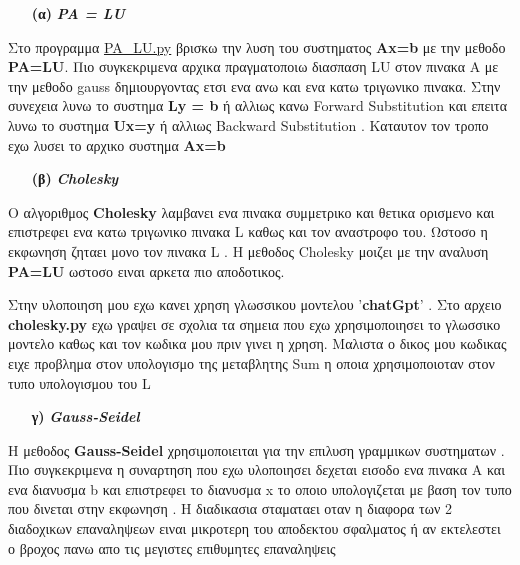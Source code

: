\documentclass[a4paper,11pt]{article}
\begin{document}
	\begin{enumerate}
		\item[\textbf{(α)}] \emph {\textbf{PA = LU}}
	\end{enumerate}
	\begin{center}
		Στο προγραμμα \underline{PA\_LU.py} βρισκω την λυση του συστηματος \textbf{Ax=b} με την μεθοδο \textbf{PA=LU}. Πιο συγκεκριμενα αρχικα πραγματοποιω διασπαση LU στον πινακα Α με την μεθοδο gauss δημιουργοντας ετσι ενα ανω και ενα κατω τριγωνικο πινακα. Στην συνεχεια λυνω το συστημα \textbf{Ly = b} ή αλλιως κανω Forward Substitution και επειτα λυνω το συστημα \textbf{Ux=y} ή αλλιως Backward Substitution . Καταυτον τον τροπο εχω λυσει το αρχικο συστημα \textbf{Ax=b}
	\end{center}
	\begin{enumerate}
		\item[\textbf{(β)}] \emph {\textbf{Cholesky}}
	\end{enumerate}
	\begin{center}
		Ο αλγοριθμος \textbf{Cholesky} λαμβανει ενα πινακα συμμετρικο και θετικα ορισμενο και επιστρεφει ενα κατω τριγωνικο πινακα L καθως και τον αναστροφο του. Ωστοσο η εκφωνηση ζηταει μονο τον πινακα L . Η μεθοδος Cholesky μοιζει με την αναλυση \textbf{PA=LU} ωστοσο ειναι αρκετα πιο αποδοτικος. 
	\end{center}
	\begin{center}
		Στην υλοποιηση μου εχω κανει χρηση γλωσσικου μοντελου '\textbf{chatGpt}' . Στο αρχειο \textbf{cholesky.py} εχω γραψει σε σχολια τα σημεια που εχω χρησιμοποιησει το γλωσσικο μοντελο καθως και τον κωδικα μου πριν γινει η χρηση. Μαλιστα ο δικος μου κωδικας ειχε προβλημα στον υπολογισμο της μεταβλητης Sum η οποια χρησιμοποιοταν στον τυπο υπολογισμου του L
	\end{center}
	\begin{enumerate}
		\item[\textbf{γ)}] \emph {\textbf{Gauss-Seidel}}
	\end{enumerate}
	\begin{center}
		Η μεθοδος \textbf{Gauss-Seidel} χρησιμοποιειται για την επιλυση γραμμικων συστηματων . Πιο συγκεκριμενα η συναρτηση που εχω υλοποιησει δεχεται εισοδο ενα πινακα Α και ενα διανυσμα b και επιστρεφει το διανυσμα x το οποιο υπολογιζεται με βαση τον τυπο που δινεται στην εκφωνηση . Η διαδικασια σταματαει οταν η διαφορα των 2 διαδοχικων επαναληψεων ειναι μικροτερη του αποδεκτου σφαλματος ή αν εκτελεστει ο βροχος πανω απο τις μεγιστες επιθυμητες επαναληψεις
	\end{center}
\end{document}
